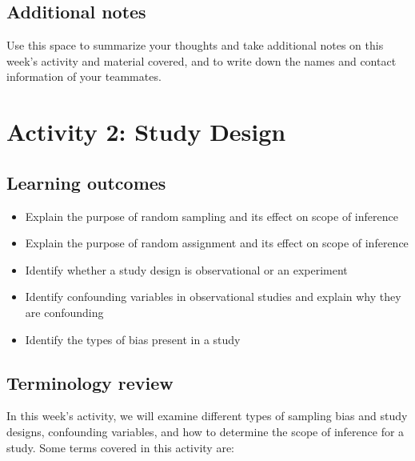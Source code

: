 \documentclass[
]{report}
\begin{document}
\vspace{0.3in}

\hypertarget{additional-notes}{%
\section{Additional notes}\label{additional-notes}}

Use this space to summarize your thoughts and take additional notes on this week's activity and material covered, and to write down the names and contact information of your teammates.

\hypertarget{activity-2-study-design}{%
\chapter{Activity 2: Study Design}\label{activity-2-study-design}}

\hypertarget{learning-outcomes}{%
\section{Learning outcomes}\label{learning-outcomes}}

\begin{itemize}
\item
  Explain the purpose of random sampling and its effect on scope of inference
\item
  Explain the purpose of random assignment and its effect on scope of inference
\item
  Identify whether a study design is observational or an experiment
\item
  Identify confounding variables in observational studies and explain why they are confounding
\item
  Identify the types of bias present in a study
\end{itemize}

\hypertarget{terminology-review}{%
\section{Terminology review}\label{terminology-review}}

In this week's activity, we will examine different types of sampling bias and study designs, confounding variables, and how to determine the scope of inference for a study. Some terms covered in this activity are:
\end{document}
